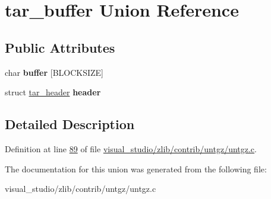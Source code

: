 \hypertarget{uniontar__buffer}{}\section{tar\+\_\+buffer Union Reference}
\label{uniontar__buffer}
\subsection*{Public Attributes}
\begin{DoxyCompactItemize}
\item 
\mbox{\label{uniontar__buffer_a009dd7c54e12b75f61a764d8a7394f64}} 
char {\bfseries buffer} \mbox{[}B\+L\+O\+C\+K\+S\+I\+ZE\mbox{]}
\item 
\mbox{\label{uniontar__buffer_a3454da53e731846565bf3080bdff9799}} 
struct \hyperlink{structtar__header}{tar\+\_\+header} {\bfseries header}
\end{DoxyCompactItemize}


\subsection{Detailed Description}


Definition at line \hyperlink{visual__studio_2zlib_2contrib_2untgz_2untgz_8c_source_l00089}{89} of file \hyperlink{visual__studio_2zlib_2contrib_2untgz_2untgz_8c_source}{visual\+\_\+studio/zlib/contrib/untgz/untgz.\+c}.



The documentation for this union was generated from the following file\+:\begin{DoxyCompactItemize}
\item 
visual\+\_\+studio/zlib/contrib/untgz/untgz.\+c\end{DoxyCompactItemize}

